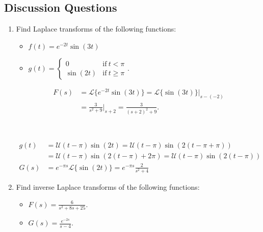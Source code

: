\documentclass[12pt]{amsart}
\numberwithin{equation}{section}
\theoremstyle{plain} %
\theoremstyle{definition}
\theoremstyle{remark}
\newcommand{\LA}[1]{\mathcal{L}\{ #1 \}}
\newcommand{\U}{\mathcal{U}}
\begin{document}
\subsection*{Discussion Questions}

\begin{enumerate}
\item Find Laplace transforms of the following functions:
\begin{itemize}
\item $f(t)= e^{-2t} \sin(3t)$
\item $g(t) = \begin{cases} 0 &\text{if} \ t< \pi\\
\sin(2t) & \text{if} \ t\geq \pi\end{cases}.$
\end{itemize}


\begin{framed}

 \[\begin{aligned} F(s)&= \LA{e^{-2t} \sin(3t)} = \LA{\sin(3t)}|_{s-(-2)} \\&= \frac{3}{s^2+9}|_{s+2} =\frac{3}{(s+2)^2 +9}.\end{aligned}\]
 
 \
 
 \[\begin{aligned} g(t) &= \U(t-\pi) \sin(2t) =  \U(t-\pi) \sin(2(t-\pi+\pi)) \\&=  \U(t-\pi) \sin(2(t-\pi)+2\pi) =\U(t-\pi) \sin(2(t-\pi))\\
 G(s) &= e^{-\pi s} \LA{\sin(2t)} = e^{-\pi s} \frac{2}{s^2 +4}\end{aligned}\]

\end{framed}


\item Find inverse Laplace transforms of the following functions:
\begin{itemize}
\item $\displaystyle F(s) = \frac{6}{s^2 + 8s + 25}$.
\item  $\displaystyle G(s)= \frac{e^{-2s}}{s-4}$.
\end{itemize}


\end{enumerate}
\end{document}
